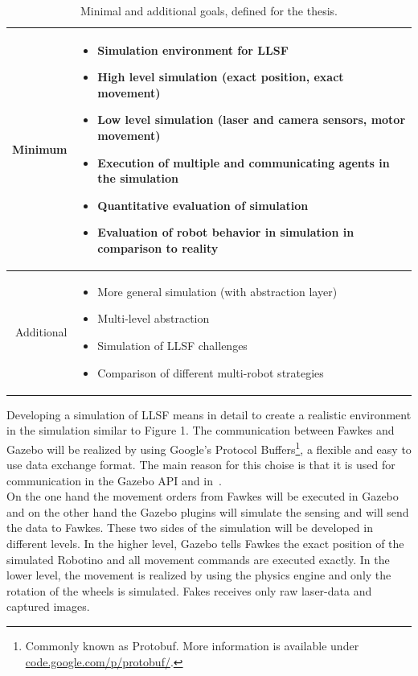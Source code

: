 \documentclass[a4paper,11pt]{article}
\begin{document}
\begin{table}
\centering
\begin{tabular}{|r||p{10cm}|}
\hline
Minimum & \begin{itemize}
\item Simulation environment for LLSF
\item High level simulation (exact position, exact movement)
\item Low level simulation (laser and camera sensors, motor movement)
\item Execution of multiple and communicating agents in the simulation
\item Quantitative evaluation of simulation
\item Evaluation of robot behavior in simulation in comparison to reality
\end{itemize}\\ \hline
Additional & \begin{itemize}
\item More general simulation (with abstraction layer)
\item Multi-level abstraction
\item Simulation of LLSF challenges
\item Comparison of different multi-robot strategies
\end{itemize}\\
\hline
\end{tabular}
\label{Table 1}
\caption{Minimal and additional goals, defined for the thesis.}
\end{table}
Developing a simulation of LLSF means in detail to create a realistic environment in the simulation similar to Figure 1. The communication between Fawkes and Gazebo will be realized by using Google's Protocol Buffers\footnote{Commonly known as Protobuf. More information is available under \url{code.google.com/p/protobuf/}.}, a flexible and easy to use data exchange format. The main reason for this choise is that it is used for communication in the Gazebo API and in~\cite{KlingenDA}.\\
On the one hand the movement orders from Fawkes will be executed in Gazebo and on the other hand the Gazebo plugins will simulate the sensing and will send the data to Fawkes. These two sides of the simulation will be developed in different levels. In the higher level, Gazebo tells Fawkes the exact position of the simulated Robotino and all movement commands are executed exactly. In the lower level, the movement is realized by using the physics engine and only the rotation of the wheels is simulated. Fakes receives only raw laser-data and captured images.\\
\end{document}

